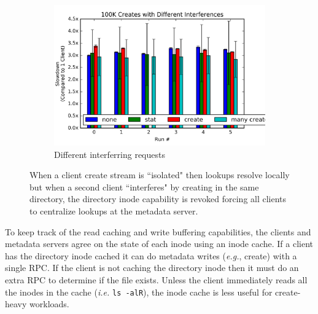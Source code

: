 \begin{figure}[t]
\begin{subfigure}[b]{.3\linewidth}
      \includegraphics[width=1.0\linewidth]{graphs/slowdown-interfere-types.png}
      \caption{Different interferring requests}
      \label{fig:interfere-c}
  \end{subfigure}
  \caption{When a client create stream is ``isolated" then lookups resolve
  locally but when a second client ``interferes" by creating in the same
  directory, the directory inode capability is revoked forcing all clients to
  centralize lookups at the metadata server.  
  \label{fig:interfere}}
\end{figure}

To keep track of the read caching and write buffering capabilities, the clients
and metadata servers agree on the state of each inode using an inode cache.  If
a client has the directory inode cached it can do metadata writes ({\it e.g.},
create) with a single RPC. If the client is not caching the directory inode
then it must do an extra RPC to determine if the file exists.  Unless the
client immediately reads all the inodes in the cache ({\it i.e.} \texttt{ls
-alR}), the inode cache is less useful for create-heavy workloads.

